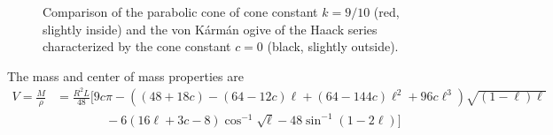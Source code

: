 \documentclass[11pt,dvipsnames]{thesis}
\begin{document}
\begin{figure}[H]
\begin{tikzpicture}[scale=2]

\end{tikzpicture}

\caption{Comparison of the parabolic cone of cone constant $k = 9/10$ (red, slightly inside) and the von K\'{a}rm\'{a}n ogive of the Haack series characterized by the cone constant $c = 0$ (black, slightly outside).}
\end{figure}
\noindent


The mass and center of mass properties are
\begin{align}
V = \frac{M}{\rho} &= \frac{R^2 L}{48} \Big[9c\pi - \left((48 + 18c) - (64 - 12c)\ell + (64 - 144c)\ell^2 + 96c\ell^3\right)\sqrt{(1 - \ell)\ell} \nonumber\\
&\qquad\qquad -6(16\ell + 3c - 8)\cos^{-1}\sqrt{\ell} - 48\sin^{-1}(1 - 2\ell)\Big]
\end{align}
\end{document}
